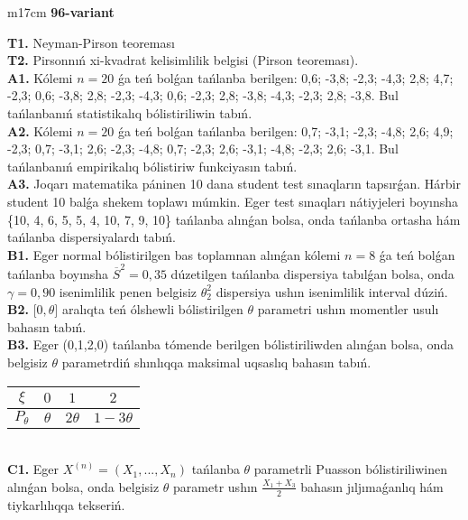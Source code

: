 \documentclass{article}
\begin{document}
\begin{tabular}{m{17cm}}
\textbf{96-variant}
\newline

\textbf{T1.} 
Neyman-Pirson teoreması
 \\
\textbf{T2.} 
Pirsonnıń xi-kvadrat kelisimlilik belgisi (Pirson teoreması).
 \\
\textbf{A1.} 
Kólemi \(n = 20\) ǵa teń bolǵan tańlanba berilgen: 0,6; -3,8; -2,3; -4,3; 2,8; 4,7; -2,3; 0,6; -3,8; 2,8; -2,3; -4,3; 0,6; -2,3; 2,8; -3,8; -4,3; -2,3; 2,8; -3,8. Bul tańlanbanıń statistikalıq bólistiriliwin tabıń.
 \\
\textbf{A2.} 
Kólemi \(n = 20\) ǵa teń bolǵan tańlanba berilgen: 0,7; -3,1; -2,3; -4,8; 2,6; 4,9; -2,3; 0,7; -3,1; 2,6; -2,3; -4,8; 0,7; -2,3; 2,6; -3,1; -4,8; -2,3; 2,6; -3,1. Bul tańlanbanıń empirikalıq bólistiriw funkciyasın tabıń.
 \\
\textbf{A3.} 
Joqarı matematika páninen 10 dana student test sınaqların tapsırǵan. Hárbir student 10 balǵa shekem toplawı múmkin. Eger test sınaqları nátiyjeleri boyınsha \{10, 4, 6, 5, 5, 4, 10, 7, 9, 10\} tańlanba alınǵan bolsa, onda tańlanba ortasha hám tańlanba dispersiyalardı tabıń.
 \\
\textbf{B1.} 
Eger normal bólistirilgen bas toplamnan alınǵan kólemi \(n = 8\) ǵa teń bolǵan tańlanba boyınsha \({\overline{S}}^{2} = 0,35\) dúzetilgen tańlanba dispersiya tabılǵan bolsa, onda \(\gamma = 0,90\) isenimlilik penen belgisiz \(\theta_{2}^{2}\) dispersiya ushın isenimlilik interval dúziń.
 \\
\textbf{B2.} 
\(\lbrack 0,\theta\rbrack\) aralıqta teń ólshewli bólistirilgen \(\theta\) parametri ushın momentler usulı bahasın tabıń.
 \\
\textbf{B3.} 
Eger (0,1,2,0) tańlanba tómende berilgen bólistiriliwden alınǵan bolsa, onda belgisiz \(\theta\) parametrdiń shınlıqqa maksimal uqsaslıq bahasın tabıń.
\begin{tabular}{|c|c|c|c|}
  \hline
$\xi$
&
$0$
&
$1$
&
$2$\\
\hline
\(P_{\theta}\) & \(\theta\) & \(2\theta\) & \(1 - 3\theta\) \\
\hline
\end{tabular}
 \\
\textbf{C1.} 
Eger \(X^{(n)} = \left( X_{1},...,X_{n} \right)\) tańlanba \(\theta\) parametrli Puasson bólistiriliwinen alınǵan bolsa, onda belgisiz \(\theta\) parametr ushın \(\frac{X_{1} + X_{3}}{2}\) bahasın jıljımaǵanlıq hám tiykarlılıqqa tekseriń.
 \\

\end{tabular}
\end{document}
